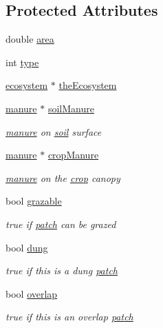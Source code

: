 \subsection*{Protected Attributes}
\begin{DoxyCompactItemize}
\item 
double \hyperlink{classpatch_a151115fdf426eff6c70a6edfd7d6efa5}{area}
\item 
int \hyperlink{classpatch_ab5d8e4af96815a6b8ce482b5dc5e703f}{type}
\item 
\hyperlink{classecosystem}{ecosystem} $\ast$ \hyperlink{classpatch_a64f864d5f2b8b5cfd782490073cabd1d}{theEcosystem}
\item 
\hyperlink{classmanure}{manure} $\ast$ \hyperlink{classpatch_a5cb930252aebd6491a5fb25d9b6be618}{soilManure}
\begin{DoxyCompactList}\small\item\em \hyperlink{classmanure}{manure} on \hyperlink{classsoil}{soil} surface \item\end{DoxyCompactList}\item 
\hyperlink{classmanure}{manure} $\ast$ \hyperlink{classpatch_a59e317efc68286e1d79f5325e9aecda3}{cropManure}
\begin{DoxyCompactList}\small\item\em \hyperlink{classmanure}{manure} on the \hyperlink{classcrop}{crop} canopy \item\end{DoxyCompactList}\item 
bool \hyperlink{classpatch_a47626e127c8decb1a45229fd8b6e0469}{grazable}
\begin{DoxyCompactList}\small\item\em true if \hyperlink{classpatch}{patch} can be grazed \item\end{DoxyCompactList}\item 
bool \hyperlink{classpatch_aec296679db0f5d3fb95f0d4975f1e66f}{dung}
\begin{DoxyCompactList}\small\item\em true if this is a dung \hyperlink{classpatch}{patch} \item\end{DoxyCompactList}\item 
bool \hyperlink{classpatch_a8f5b427e53ac95a509bc122c3ae38798}{overlap}
\begin{DoxyCompactList}\small\item\em true if this is an overlap \hyperlink{classpatch}{patch} \item\end{DoxyCompactList}\item 

\end{DoxyCompactItemize}
